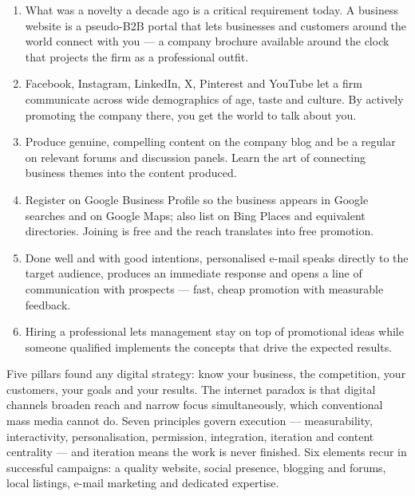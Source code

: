 \documentclass{MMTextbook}
\begin{document}
\begin{enumerate}
\item {} What was a novelty a decade ago is a
      critical requirement today. A business website is a pseudo-B2B portal
      that lets businesses and customers around the world connect with you ---
      a company brochure available around the clock that projects the firm as a
      professional outfit.
\item {} Facebook, Instagram, LinkedIn, X, Pinterest
      and YouTube let a firm communicate across wide demographics of age, taste
      and culture. By actively promoting the company there, you get the world to
      talk about you.
\item {} Produce genuine, compelling content on the
      company blog and be a regular on relevant forums and discussion panels.
      Learn the art of connecting business themes into the content produced.
\item {} Register on Google Business Profile so the
      business appears in Google searches and on Google Maps; also list on Bing
      Places and equivalent directories. Joining is free and the reach
      translates into free promotion.
\item {} Done well and with good intentions, personalised
      e-mail speaks directly to the target audience, produces an immediate
      response and opens a line of communication with prospects --- fast, cheap
      promotion with measurable feedback.
\item {} Hiring a professional lets
      management stay on top of promotional ideas while someone qualified
      implements the concepts that drive the expected results.
\end{enumerate}

\begin{summarybox}
Five pillars found any digital strategy: know your business, the competition,
your customers, your goals and your results. The internet paradox is that
digital channels broaden reach and narrow focus simultaneously, which
conventional mass media cannot do. Seven principles govern execution ---
measurability, interactivity, personalisation, permission, integration,
iteration and content centrality --- and iteration means the work is never
finished. Six elements recur in successful campaigns: a quality website, social
presence, blogging and forums, local listings, e-mail marketing and dedicated
expertise.
\end{summarybox}
\end{document}
